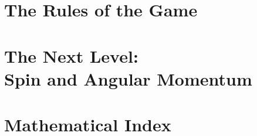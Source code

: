 \documentclass[12pt,letterpaper]{book}
\begin{document}



\chapter{The Rules of the Game}






\chapter{The Next Level: \\ Spin and Angular Momentum}


\chapter{Mathematical Index}

\end{document}
